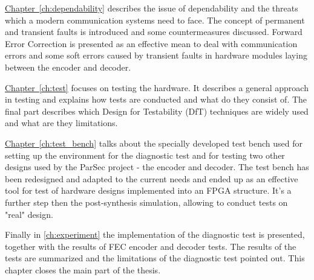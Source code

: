 \hyperref[ch:dependability]{Chapter~\ref*{ch:dependability}} describes the issue of dependability and the threats which a modern communication systems need to face. The concept of permanent and transient faults is introduced and some countermeasures discussed. Forward Error Correction is presented as an effective mean to deal with communication errors and some soft errors caused by transient faults in hardware modules laying between the encoder and decoder.

\hyperref[ch:test]{Chapter~\ref*{ch:test}} focuses on testing the hardware. It describes a general approach in testing and explains how tests are conducted and what do they consist of. The final part describes which Design for Testability (DfT) techniques are widely used and what are they limitations.

\hyperref[ch:test_bench]{Chapter~\ref*{ch:test_bench}} talks about the specially developed test bench used for setting up the environment for the diagnostic test and for testing two other designs used by the ParSec project - the encoder and decoder. The test bench has been redesigned and adapted to the current needs and ended up as an effective tool for test of hardware designs implemented into an FPGA structure. It's a further step then the post-synthesis simulation, allowing to conduct tests on "real" design.

Finally in \autoref{ch:experiment} the implementation of the diagnostic test is presented, together with the results of FEC encoder and decoder tests. The results of the tests are summarized and the limitations of the diagnostic test pointed out. This chapter closes the main part of the thesis.

